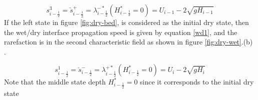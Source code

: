 \documentclass[12pt,a4paper]{article}
\begin{document}
{	\begin{equation}
		s_{i-\frac{1}{2}}^{3} = \check{s}_{i-\frac{1}{2}}^{+} = \lambda_{i-\frac{1}{2}}^{-*}(H^{*}_{i-\frac{1}{2}}=0)= U_{i-1} - 2\sqrt{gH_{i-1}}
		\label{wd0}
	\end{equation}
	If the left state in figure \ref{fig:dry-bed}, is considered as the initial dry state, then the  wet/dry interface propagation  speed  is given by equation \eqref{wd1}, and the  rarefaction is in the second characteristic field  as shown in figure \ref{fig:dry-wet}.(b) \cite{ge:2008}.
	
	\begin{equation}
		s_{i-\frac{1}{2}}^{1} = \check{s}_{i-\frac{1}{2}}^{-} = \lambda_{i-\frac{1}{2}}^{+*}(H^{*}_{i-\frac{1}{2}}=0)= U_{i} - 2\sqrt{gH_{i}}
		\label{wd1}
	\end{equation}
	Note that the middle state depth $H^{*}_{i-\frac{1}{2}}=0$ since it corresponds to the initial dry state
} %
\end{document}
